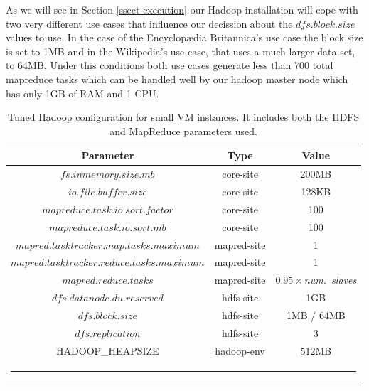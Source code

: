\documentclass[oribibl]{llncs_Ibergrid2013}
\begin{document}
As we will see in Section \ref{ssect-execution} our Hadoop installation will cope with two very different use cases that influence our decission about the $dfs.block.size$ values to use. In the case of the Encyclop{\ae}dia Britannica's use case the block size is set to 1MB and in the Wikipedia's use case, that uses a much larger data set, to 64MB. Under this conditions both use cases generate less than 700 total mapreduce tasks which can be handled well by our hadoop master node which has only 1GB of RAM and 1 CPU.


\begin{table}[h!]
\caption{Tuned Hadoop configuration for small VM instances. It includes both the HDFS and MapReduce parameters used.}
\label{table:conf}
%
\vspace{-0.5em}
%
\begin{center}
\begin{tabular}{ccc}
\toprule
Parameter				& Type 			& Value	 	\\
\midrule
$fs.inmemory.size.mb$			& core-site		& 200MB	 	\\
$io.file.buffer.size$                  	& core-site		& 128KB  	\\
$mapreduce.task.io.sort.factor$ 	& core-site		& 100	 	\\
$mapreduce.task.io.sort.mb$ 	 	& core-site		& 100	 	\\
$mapred.tasktracker.map.tasks.maximum$ 	& mapred-site		& 1	 	\\
$mapred.tasktracker.reduce.tasks.maximum$ & mapred-site		& 1	 	\\
$mapred.reduce.tasks$ 			& mapred-site		& $0.95\times$\emph{num.~slaves} \\
$dfs.datanode.du.reserved$ 		& hdfs-site		& 1GB	 	\\
$dfs.block.size$ 			& hdfs-site		& 1MB / 64MB 	\\
$dfs.replication$ 			& hdfs-site		& 3	 	\\
HADOOP\_HEAPSIZE            	 	& hadoop-env   		& 512MB 	\\
%
%
\bottomrule
\multicolumn{3}{c}{\rule{0.98\textwidth}{0em}}\\
\end{tabular}
\end{center}
\end{table}
\end{document}
